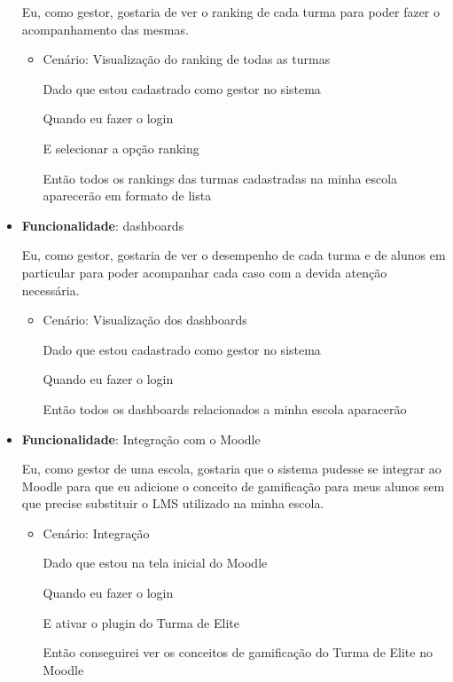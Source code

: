 \documentclass[
    12pt,               %
    openright,          %
    oneside,
    a4paper,            %
    english,            %
    brazil              %
    ]{ifsp-spo-inf-ctds} %
\begin{document}
\begin{itemize}
    Eu, como gestor, gostaria de ver o ranking de cada turma para poder fazer o acompanhamento das mesmas.
    \begin{itemize}
        \item Cenário: Visualização do ranking de todas as turmas
        \par Dado que estou cadastrado como gestor no sistema
        \par Quando eu fazer o login
        \par E selecionar a opção ranking
        \par Então todos os rankings das turmas cadastradas na minha escola aparecerão em formato de lista
    \end{itemize}

\item\textbf{Funcionalidade}: \glspl{dashboard}
    
    Eu, como gestor, gostaria de ver o desempenho de cada turma e de alunos em particular para poder acompanhar cada caso com a devida atenção necessária.
    \begin{itemize}
        \item Cenário: Visualização dos dashboards 
        \par Dado que estou cadastrado como gestor no sistema
        \par Quando eu fazer o login
        \par Então todos os dashboards relacionados a minha escola aparacerão
    \end{itemize}   

\item\textbf{Funcionalidade}: Integração com o Moodle
    
    Eu, como gestor de uma escola, gostaria que o sistema pudesse se integrar ao Moodle para que eu adicione o conceito de gamificação para meus alunos sem que precise substituir o LMS utilizado na minha escola.
    \begin{itemize}
        \item Cenário: Integração 
        \par Dado que estou na tela inicial do Moodle
        \par Quando eu fazer o login 
        \par E ativar o plugin do Turma de Elite
        \par Então conseguirei ver os conceitos de gamificação do Turma de Elite no Moodle
    \end{itemize}  
\end{itemize} 
\end{document}
